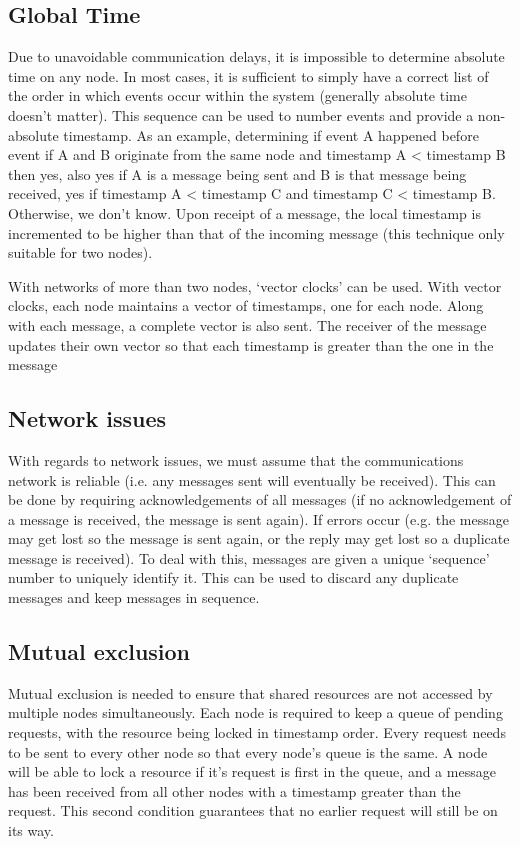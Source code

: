\documentclass[a4paper,oneside]{report}
\begin{document}
		\subsection{Global Time}
   	
   		Due to unavoidable communication delays, it is impossible to determine absolute time on any node. In most cases, it is sufficient to simply have a correct list of the order in which events occur within the system (generally absolute time doesn't matter). This sequence can be used to number events and provide a non-absolute timestamp. As an example, determining if event A happened before event if A and B originate from the same node and timestamp A < timestamp B then yes, also yes if A is a message being sent and B is that message being received, yes if timestamp A < timestamp C and timestamp C < timestamp B. Otherwise, we don’t know. Upon receipt of a message, the local timestamp is incremented to be higher than that of the incoming message (this technique only suitable for two nodes). 
   
   	With networks of more than two nodes, `vector clocks' can be used. With vector clocks, each node maintains a vector of timestamps, one for each node. Along with each message, a complete vector is also sent. The receiver of the message updates their own vector so that each timestamp is greater than the one in the message
      	
    	\subsection{Network issues}
    	With regards to network issues, we must assume that the communications network is reliable (i.e. any messages sent will eventually be received). This can be done by requiring acknowledgements of all messages (if no acknowledgement of a message is received, the message is sent again). If errors occur (e.g. the message may get lost so the message is sent again, or the reply may get lost so a duplicate message is received). To deal with this, messages are given a unique `sequence' number to uniquely identify it. This can be used to discard any duplicate messages and keep messages in sequence.
    	
    	\subsection{Mutual exclusion}
    	Mutual exclusion is needed to ensure that shared resources are not accessed by multiple nodes simultaneously. Each node is required to keep a queue of pending requests, with the resource being locked in timestamp order. Every request needs to be sent to every other node so that every node’s queue is the same. A node will be able to lock a resource if it's request is first in the queue, and a message has been received from all other nodes with a timestamp greater than the request. This second condition guarantees that no earlier request will still be on its way.
    	
\end{document}
